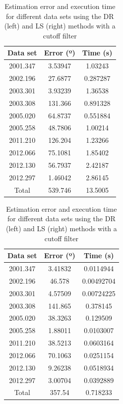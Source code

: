 \begin{table}[h!]
	\centering
	\def\arraystretch{1.2}
	\begin{tabular}{|c c c|} 
		\hline
		Data set & Error (º) & Time (s) \\ [0.3ex] 
		\hline\hline
		2001.347 & 3.53947 & 1.03243 \\
		\hline
		2002.196 & 27.6877 & 0.287287 \\
		\hline
		2003.301 & 3.93239 & 1.36538 \\
		\hline
		2003.308 & 131.366 & 0.891328 \\
		\hline
		2005.020 & 64.8737 & 0.551884 \\
		\hline
		2005.258 & 48.7806 & 1.00214 \\
		\hline
		2011.210 & 126.204 & 1.23266 \\
		\hline
		2012.066 & 75.1081 & 1.85402 \\
		\hline
		2012.130 & 56.7937 & 2.42187 \\
		\hline
		2012.297 & 1.46042 & 2.86145 \\
		\hline
		Total & 539.746 & 13.5005 \\
		\hline
	\end{tabular}
	\quad\quad\quad
	\begin{tabular}{|c c c|} 
		\hline
		Data set & Error (º) & Time (s) \\ [0.3ex] 
		\hline\hline
		2001.347 & 3.41832 & 0.0114944 \\
		\hline
		2002.196 & 46.578 & 0.00492704 \\
		\hline
		2003.301 & 4.57509 & 0.00724225 \\
		\hline
		2003.308 & 141.865 & 0.378145 \\
		\hline
		2005.020 & 38.3263 & 0.129509 \\
		\hline
		2005.258 & 1.88011 & 0.0103007 \\
		\hline
		2011.210 & 38.5213 & 0.0603164 \\
		\hline
		2012.066 & 70.1063 & 0.0251154 \\
		\hline
		2012.130 & 9.26238 & 0.0518934 \\
		\hline
		2012.297 & 3.00704 & 0.0392889 \\
		\hline
		Total & 357.54 & 0.718233 \\
		\hline
	\end{tabular}
	\caption{Estimation error and execution time for different data sets using the DR (left) and LS (right) methods with a cutoff filter}
	\label{tb:basicCutoff}
\end{table}

